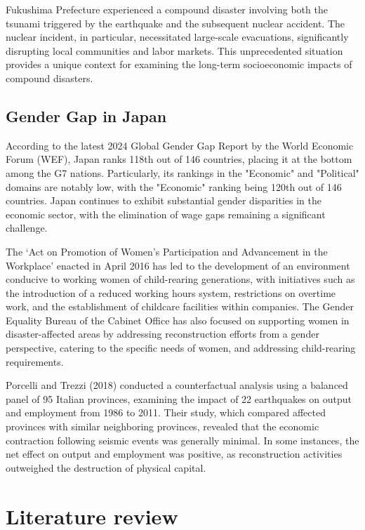 \documentclass[12pt,halfline,a4paper]{ouparticle}
\begin{document}
Fukushima Prefecture experienced a compound disaster involving both the tsunami triggered by the earthquake and the subsequent nuclear accident. The nuclear incident, in particular, necessitated large-scale evacuations, significantly disrupting local communities and labor markets. This unprecedented situation provides a unique context for examining the long-term socioeconomic impacts of compound disasters.

\subsection{Gender Gap in Japan}
\label{sec5.1}

According to the latest 2024 Global Gender Gap Report by the World Economic Forum (WEF), Japan ranks 118th out of 146 countries, placing it at the bottom among the G7 nations. Particularly, its rankings in the "Economic" and "Political" domains are notably low, with the "Economic" ranking being 120th out of 146 countries. Japan continues to exhibit substantial gender disparities in the economic sector, with the elimination of wage gaps remaining a significant challenge.

The ‘Act on Promotion of Women’s Participation and Advancement in the Workplace’ enacted in April 2016 has led to the development of an environment conducive to working women of child-rearing generations, with initiatives such as the introduction of a reduced working hours system, restrictions on overtime work, and the establishment of childcare facilities within companies. The Gender Equality Bureau of the Cabinet Office has also focused on supporting women in disaster-affected areas by addressing reconstruction efforts from a gender perspective, catering to the specific needs of women, and addressing child-rearing requirements.

 Porcelli and Trezzi (2018)\cite{Porcelli2019TheItaly} conducted a counterfactual analysis using a balanced panel of 95 Italian provinces, examining the impact of 22 earthquakes on output and employment from 1986 to 2011. Their study, which compared affected provinces with similar neighboring provinces, revealed that the economic contraction following seismic events was generally minimal. In some instances, the net effect on output and employment was positive, as reconstruction activities outweighed the destruction of physical capital.



\section{Literature review}
\label{sec3}
\end{document}
